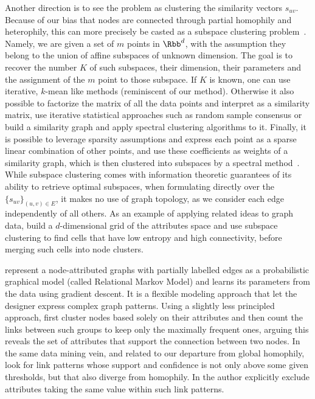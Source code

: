 Another direction is to see the problem as clustering the similarity vectors $s_{uv}$. Because of
our bias that nodes are connected through partial homophily and heterophily, this can more precisely
be casted as a subspace clustering problem~\autocite{SCSurvey11}. Namely, we are given a set of $m$
points in $\Rbb^d$, with the assumption they belong to the union of affine subspaces of unknown
dimension. The goal is to recover the number $K$ of such subspaces, their dimension, their
parameters and the assignment of the $m$ point to those subspace. If $K$ is known, one can use
iterative, $k$-mean like methods (reminiscent of our \lloyd{} method). Otherwise it also possible to
factorize the matrix of all the data points and interpret as a similarity matrix, use iterative
statistical approaches such as random sample consensus or build a similarity graph and apply
spectral clustering algorithms to it. Finally, it is possible to leverage sparsity assumptions and
express each point as a sparse linear combination of other points, and use these coefficients as
weights of a similarity graph, which is then clustered into subspaces by a spectral
method~\autocite{SparseSC13}.
While subspace clustering comes with information theoretic guarantees of its ability to retrieve
optimal subspaces, when formulating directly over the $\{s_{uv}\}_{(u,v) \in E}$, it makes no use of
graph topology, as we consider each edge independently of all others. As an example of applying
related ideas to graph data, \textcite{Huang2015} build a $d$-dimensional grid of the attributes
space and use subspace clustering to find cells that have low entropy and high connectivity, before
merging such cells into node clusters.


\Textcite{Taskar04} represent a node-attributed graphs with partially labelled edges as a
probabilistic graphical model (called Relational Markov Model) and learns its parameters from the
data using gradient descent. It is a flexible modeling approach that let the designer express
complex graph patterns. Using a slightly less principled approach, \textcite{conceptualLinks12}
first cluster nodes based solely on their attributes and then count the links between such groups to
keep only the maximally frequent ones, arguing this reveals the set of attributes that support the
connection between two nodes. In the same data mining vein, and related to our departure from global
homophily, \textcite{beyondHome16} look for link patterns whose support and confidence is not only
above some given thresholds, but that also diverge from homophily. In the author explicitly exclude
attributes taking the same value within such link patterns.

